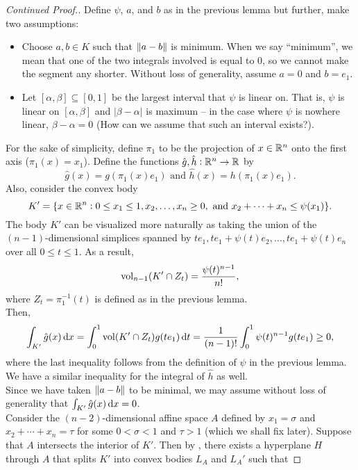 \begin{proof}[Continued Proof.]
	Define $\psi$, $a$, and $b$ as in the previous lemma but further, make two assumptions: 
	\begin{itemize}
		\item Choose $a,b\in K$ such that $\left\lVert a-b\right\rVert$ is minimum. When we say ``minimum'', we mean that one of the two integrals involved is equal to $0$, so we cannot make the segment any shorter. Without loss of generality, assume $a=0$ and $b=e_1$.
		\item Let $[\alpha,\beta]\subseteq[0,1]$ be the largest interval that $\psi$ is linear on. That is, $\psi$ is linear on $[\alpha,\beta]$ and $|\beta-\alpha|$ is maximum -- in the case where $\psi$ is nowhere linear, $\beta-\alpha=0$ (How can we assume that such an interval exists?).
	\end{itemize}
	For the sake of simplicity, define $\pi_1$ to be the projection of $x\in\mathbb{R}^n$ onto the first axis ($\pi_1(x)=x_1$). Define the functions $\hat{g},\hat{h}:\mathbb{R}^n\to\mathbb{R}$ by
	\[ \hat{g}(x)=g(\pi_1(x)e_1) \text{ and } \hat{h}(x)=h(\pi_1(x)e_1). \]
	Also, consider the convex body
	\[ K' = \{x\in\mathbb{R}^n : 0\leq x_1\leq 1, x_2,\ldots,x_n\geq 0,\text{ and }x_2+\cdots+x_n\leq\psi(x_1)\}. \]
	The body $K'$ can be visualized more naturally as taking the union of the $(n-1)$-dimensional simplices spanned by $te_1, te_1+\psi(t)e_2,\ldots,te_1+\psi(t)e_n$ over all $0\leq t\leq 1$. As a result,
	\[ \operatorname{vol}_{n-1} (K'\cap Z_t) = \frac{\psi(t)^{n-1}}{n!}, \]
	where $Z_t=\pi_1^{-1}(t)$ is defined as in the previous lemma.\\
	Then,
	\[ \int_{K'} \hat{g}(x)\operatorname{d}\!{x} = \int_0^1 \operatorname{vol}(K' \cap Z_t) g(t e_1) \operatorname{d}\!{t} = \frac{1}{(n-1)!} \int_0^1 \psi(t)^{n-1} g(te_1) \geq 0, \]
	where the last inequality follows from the definition of $\psi$ in the previous lemma. We have a similar inequality for the integral of $\hat{h}$ as well.\\
	Since we have taken $\left\lVert a-b\right\rVert$ to be minimal, we may assume without loss of generality that $\int_{K'}\hat{g}(x)\operatorname{d}\!{x}=0$.\\
	Consider the $(n-2)$-dimensional affine space $A$ defined by $x_1=\sigma$ and $x_2+\cdots+x_n=\tau$ for some $0<\sigma<1$ and $\tau>1$ (which we shall fix later). Suppose that $A$ intersects the interior of $K'$. Then by , there exists a hyperplane $H$ through $A$ that splits $K'$ into convex bodies $L_A$ and $L_A'$ such that

\end{proof}
